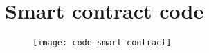 \section{Smart contract code}\label{sec:appendix-code}
\begin{figure}[H]
    \centering
    \texttt{[image: code-smart-contract]}
    \label{fig:smart-contract-code}
\end{figure}
\restoregeometry
